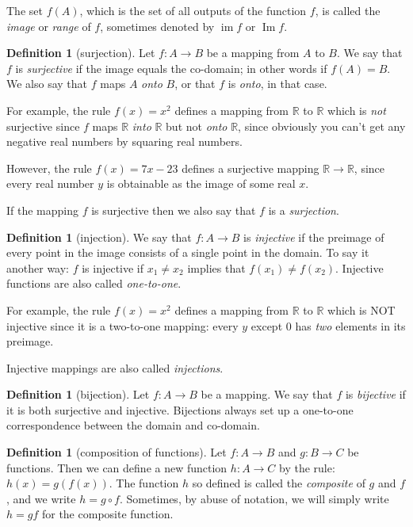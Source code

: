 \documentclass[11pt]{article}
\theoremstyle{definition}
\newtheorem{defn}[thm]{Definition}
\newcommand{\R}{\mathbb{R}} %
\newcommand{\compose}{\circ} %
\begin{document}
The set $f(A)$, which is the set of all outputs of the function $f$,
is called the {\em image} or \emph{range} of $f$, sometimes denoted by
$\operatorname{im} f$ or $\operatorname{Im} f$.



\begin{defn}[surjection]
Let $f: A \to B$ be a mapping from $A$ to $B$. We say that $f$ is {\em
  surjective} if the image equals the co-domain; in
other words if $f(A) = B$. We also say that $f$ maps $A$ {\em onto}
$B$, or that $f$ is \emph{onto}, in that case.
\end{defn}

For example, the rule $f(x) = x^2$ defines a mapping from $\R$ to $\R$
which is \emph{not} surjective since $f$ maps $\R$ {\em into} $\R$ but not
{\em onto} $\R$, since obviously you can't get any negative real
numbers by squaring real numbers.

However, the rule $f(x) = 7x-23$ defines a surjective mapping $\R \to \R$,
since every real number $y$ is obtainable as the image of some real $x$. 

If the mapping $f$ is surjective then we also say that $f$ is a {\em
surjection}.

\begin{defn}[injection]
We say that $f: A \to B$ is {\em injective} if the preimage of every
point in the image consists of a single point in the domain. To say it
another way: $f$ is injective if $x_1 \ne x_2$ implies that $f(x_1)
\ne f(x_2)$. Injective functions are also called {\em one-to-one}.
\end{defn} 

For example, the rule $f(x) = x^2$ defines a mapping from $\R$ to $\R$
which is NOT injective since it is a two-to-one mapping: every $y$
except $0$ has \emph{two} elements in its preimage.


Injective mappings are also called {\em injections}.


\begin{defn}[bijection]
Let $f: A \to B$ be a mapping. We say that $f$ is {\em bijective} if
it is both surjective and injective. Bijections always set up a
one-to-one correspondence between the domain and co-domain.
\end{defn}



\begin{defn}[composition of functions]
Let $f:A \to B$ and $g:B \to C$ be functions. Then we can define a new
function $h: A \to C$ by the rule: $h(x) = g(f(x))$. The function $h$
so defined is called the {\em composite} of $g$ and $f$, and we write
$h = g \compose f$.  Sometimes, by abuse of notation, we will simply
write $h = gf$ for the composite function.
\end{defn}
\end{document}
